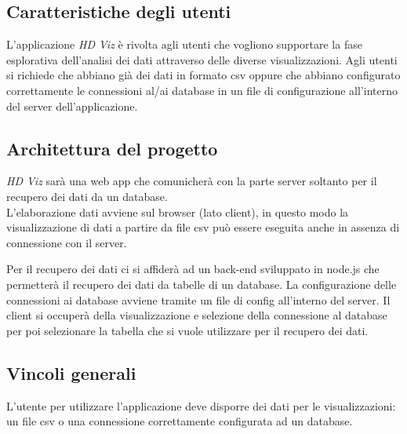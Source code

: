 \subsection{Caratteristiche degli utenti}
L'applicazione \emph{HD Viz} è rivolta agli utenti che vogliono supportare la fase esplorativa dell'analisi dei dati attraverso delle diverse visualizzazioni. Agli utenti si richiede che abbiano già dei dati in formato csv oppure che abbiano configurato correttamente le connessioni al/ai database in un file di configurazione all'interno del server dell'applicazione.


\subsection{Architettura del progetto}
\emph{HD Viz} sarà una web app che comunicherà con la parte server soltanto per il recupero dei dati da un database.
\\
L'elaborazione dati avviene sul browser (lato client), in questo modo la visualizzazione di dati a partire da file csv può essere eseguita anche in assenza di connessione con il server.

Per il recupero dei dati ci si affiderà ad un back-end sviluppato in node.js che permetterà il recupero dei dati da tabelle di un database. La configurazione delle connessioni ai database avviene tramite un file di config all'interno del server. Il client si occuperà della visualizzazione e selezione della connessione al database per poi selezionare la tabella che si vuole utilizzare per il recupero dei dati.

\subsection{Vincoli generali}
L'utente per utilizzare l'applicazione deve disporre dei dati per le visualizzazioni: un file csv o una connessione correttamente configurata ad un database.
